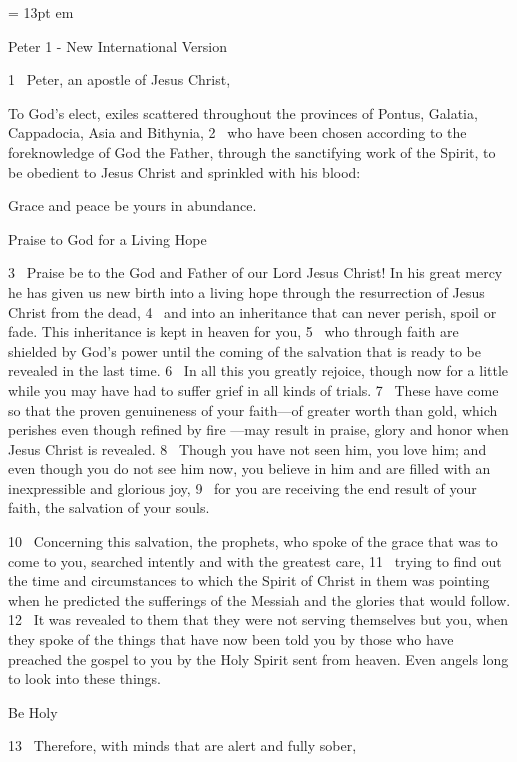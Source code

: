 
\FFrh \baselineskip = 13pt
 em


\centerline{   Peter 1 - New International Version }

\par
1 
Peter, an apostle of Jesus Christ,
\par
To God’s elect,
exiles
scattered
throughout the provinces of Pontus,
Galatia,
Cappadocia, Asia and Bithynia,
2 
who have been chosen according to the foreknowledge
of God the Father, through the sanctifying work of the Spirit,
to be obedient
to Jesus Christ and sprinkled with his blood:
\par
Grace and peace be yours in abundance.
\par
Praise to God for a Living Hope
\par
3 
Praise be to the God and Father of our Lord Jesus Christ!
In his great mercy
he has given us new birth
into a living hope
through the resurrection of Jesus Christ from the dead,
4 
and into an inheritance
that can never perish, spoil or fade.
This inheritance is kept in heaven for you,
5 
who through faith are shielded by God’s power
until the coming of the salvation
that is ready to be revealed
in the last time.
6 
In all this you greatly rejoice,
though now for a little while
you may have had to suffer grief in all kinds of trials.
7 
These have come so that the proven genuineness
of your faith—of greater worth than gold, which perishes even though refined by fire
—may result in praise, glory and honor
when Jesus Christ is revealed.
8 
Though you have not seen him, you love him; and even though you do not see him now, you believe in him
and are filled with an inexpressible and glorious joy,
9 
for you are receiving the end result of your faith, the salvation of your souls.
\par
10 
Concerning this salvation, the prophets, who spoke
of the grace that was to come to you,
searched intently and with the greatest care,
11 
trying to find out the time and circumstances to which the Spirit of Christ
in them was pointing when he predicted
the sufferings of the Messiah and the glories that would follow.
12 
It was revealed to them that they were not serving themselves but you,
when they spoke of the things that have now been told you by those who have preached the gospel to you
by the Holy Spirit sent from heaven.
Even angels long to look into these things.
\par
Be Holy
\par
13 
Therefore, with minds that are alert and fully sober,
